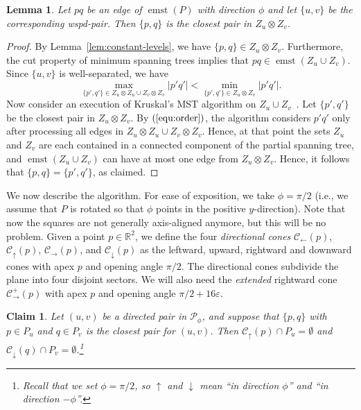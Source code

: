 \documentclass[11pt]{paper}
\newcommand {\mathset} [1] {\ensuremath {\mathbb {#1}}}
\newcommand {\R} {\mathset {R}}
\newcommand {\eps} {\varepsilon}
\DeclareMathOperator {\emst}{emst}
\newtheorem {lem}[theorem] {Lemma}
\newtheorem {claim}[theorem] {Claim}
\begin{document}
\begin{lem}\label{lem:emst_nn}
Let $pq$ be an edge of $\emst(P)$ with direction
$\phi$ and let $\{u,v\}$ be the corresponding wspd-pair.
Then $\{p,q\}$ is the closest pair in $Z_u \otimes Z_v$.
\end{lem}

\begin{proof}
By Lemma~\ref{lem:constant-levels}, we have $\{p,q\} \in Z_u \otimes Z_v$.
Furthermore, the cut property of minimum spanning trees implies that
$pq \in \emst(Z_u \cup Z_v)$.
Since $\{u, v\}$ is well-separated, we have
\begin{equation}\label{equ:order}
\max_{\{p',q'\} \in Z_u \otimes Z_u \cup Z_v \otimes Z_v} |p'q'| <
\min_{\{p',q'\} \in Z_u \otimes Z_v} |p'q'|.
\end{equation}
Now consider an execution of Kruskal's MST algorithm on
$Z_u \cup Z_v$~\cite[Chapter~23.2]{CormenLeRiSt09}.
Let $\{p', q'\}$ be the closest pair
in $Z_u \otimes Z_v$. By $(\ref{equ:order})$, the algorithm
considers $p'q'$ only after processing all edges in
$Z_u \otimes Z_u \cup Z_v \otimes Z_v$. Hence, at that point
the sets $Z_u$ and $Z_v$ are each contained in a connected component
of the partial spanning tree, and $\emst(Z_u \cup Z_v)$ can have at most one
edge from $Z_u \otimes Z_v$. Hence, it follows that
$\{p,q\} = \{p',q'\}$, as claimed.
\end{proof}


We now describe the algorithm.
For ease of exposition, we take $\phi = \pi/2$ (i.e.,
we assume that $P$ is rotated so that $\phi$ points in the positive
$y$-direction).
Note that now the squares are not generally axis-aligned anymore, but this
will be no problem.
Given a point $p \in \R^2$, we define the four
\emph{directional cones}
$\mathcal{C}_\leftarrow(p)$,$\mathcal{C}_\uparrow(p)$,
$\mathcal{C}_\rightarrow(p)$, and $\mathcal{C}_\downarrow(p)$
as the leftward, upward, rightward and downward cones with apex $p$ and
opening angle $\pi/2$. The directional cones subdivide the plane into
four disjoint sectors. We will also need the \emph{extended} rightward
cone $\mathcal{C}_\rightarrow^+(p)$ with apex $p$ and opening
angle $\pi/2+16\eps$.



\begin{claim}\label{clm:emptycone}
Let $(u,v)$ be a directed pair in  $\mathcal{P}_\phi$, 
and suppose that $\{p,q\}$ with $p \in P_u$ and $q \in P_v$
is the closest pair for $(u,v)$. 
Then $\mathcal{C}_\uparrow(p) \cap P_u = \emptyset$ and
$\mathcal{C}_\downarrow(q) \cap P_v = \emptyset$.\footnote{Recall 
that we set $\phi=\pi/2$,
so $\uparrow$ and $\downarrow$ mean ``in direction $\phi$''
and ``in direction $-\phi$''.}
\end{claim}
\end{document}
